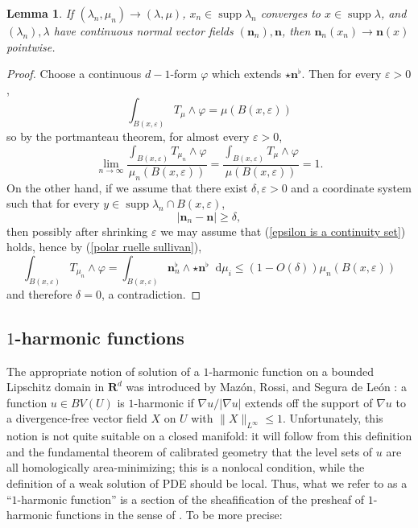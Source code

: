 \documentclass[reqno,11pt]{amsart}
\newcommand{\RR}{\mathbf{R}}
\newcommand*\dif{\mathop{}\!\mathrm{d}}
\DeclareMathOperator{\supp}{supp}
\newcommand{\normal}{\mathbf n}
\newtheorem{lemma}[theorem]{Lemma}
\theoremstyle{definition}
\numberwithin{equation}{section}
\begin{document}
\begin{lemma}\label{convergence of normals}
If $(\lambda_n, \mu_n) \to (\lambda, \mu)$, $x_n \in \supp \lambda_n$ converges to $x \in \supp \lambda$, and $(\lambda_n), \lambda$ have continuous normal vector fields $(\normal_n), \normal$, then $\normal_n(x_n) \to \normal(x)$ pointwise.
\end{lemma}
\begin{proof}
	Choose a continuous $d-1$-form $\varphi$ which extends $\star \normal^\flat$.
	Then for every $\varepsilon > 0$,
	$$\int_{B(x, \varepsilon)} T_\mu \wedge \varphi = \mu(B(x, \varepsilon))$$
	so by the portmanteau theorem, for almost every $\varepsilon > 0$,
	\begin{equation}\label{epsilon is a continuity set}
		\lim_{n \to \infty} \frac{\int_{B(x, \varepsilon)} T_{\mu_n} \wedge \varphi}{\mu_n(B(x, \varepsilon))} = \frac{\int_{B(x, \varepsilon)} T_\mu \wedge \varphi}{\mu(B(x, \varepsilon))} = 1.
	\end{equation}
	On the other hand, if we assume that there exist $\delta, \varepsilon > 0$ and a coordinate system such that for every $y \in \supp \lambda_n \cap B(x, \varepsilon)$,
	$$|\normal_n - \normal| \geq \delta,$$
	then possibly after shrinking $\varepsilon$ we may assume that (\ref{epsilon is a continuity set}) holds, hence by (\ref{polar ruelle sullivan}),
	$$\int_{B(x, \varepsilon)} T_{\mu_n} \wedge \varphi = \int_{B(x, \varepsilon)} \normal_n^\flat \wedge \star \normal^\flat \dif \mu_i \leq (1 - O(\delta)) \mu_n(B(x, \varepsilon))$$
	and therefore $\delta = 0$, a contradiction.
\end{proof}

\subsection{\texorpdfstring{$1$-harmonic}{One-harmonic} functions}
The appropriate notion of solution of a $1$-harmonic function on a bounded Lipschitz domain in $\RR^d$ was introduced by Maz\'on, Rossi, and Segura de Le\'on \cite{Mazon14}: a function $u \in BV(U)$ is $1$-harmonic if $\nabla u/|\nabla u|$ extends off the support of $\nabla u$ to a divergence-free vector field $X$ on $U$ with $\|X\|_{L^\infty} \leq 1$.
Unfortunately, this notion is not quite suitable on a closed manifold: it will follow from this definition and the fundamental theorem of calibrated geometry \cite{Harvey82} that the level sets of $u$ are all homologically area-minimizing; this is a nonlocal condition, while the definition of a weak solution of PDE should be local.
Thus, what we refer to as a ``$1$-harmonic function'' is a section of the sheafification of the presheaf of $1$-harmonic functions in the sense of \cite{Mazon14}.
To be more precise:
\end{document}

